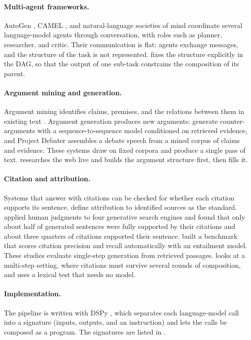 \paragraph{Multi-agent frameworks.}
AutoGen \citep{wu2023autogen}, CAMEL \citep{li2023camel}, and natural-language societies of mind \citep{zhuge2023mindstorms} coordinate several language-model agents through conversation, with roles such as planner, researcher, and critic. Their communication is flat: agents exchange messages, and the structure of the task is not represented. \sys{} fixes the structure explicitly in the DAG, so that the output of one sub-task constrains the composition of its parent.

\paragraph{Argument mining and generation.}
Argument mining identifies claims, premises, and the relations between them in existing text \citep{lawrence2020argmining}. Argument generation produces new arguments: \citet{hua2018argument} generate counter-arguments with a sequence-to-sequence model conditioned on retrieved evidence, and Project Debater \citep{slonim2021debater} assembles a debate speech from a mined corpus of claims and evidence. These systems draw on fixed corpora and produce a single pass of text. \sys{} researches the web live and builds the argument structure first, then fills it.

\paragraph{Citation and attribution.}
Systems that answer with citations can be checked for whether each citation supports its sentence. \citet{rashkin2023ais} define attribution to identified sources as the standard. \citet{liu2023verifiability} applied human judgments to four generative search engines and found that only about half of generated sentences were fully supported by their citations and about three quarters of citations supported their sentence. \citet{gao2023alce} built a benchmark that scores citation precision and recall automatically with an entailment model. These studies evaluate single-step generation from retrieved passages.  looks at a multi-step setting, where citations must survive several rounds of composition, and uses a lexical test that needs no model.

\paragraph{Implementation.}
The pipeline is written with DSPy \citep{khattab2024dspy}, which separates each language-model call into a signature (inputs, outputs, and an instruction) and lets the calls be composed as a program. The signatures are listed in .
